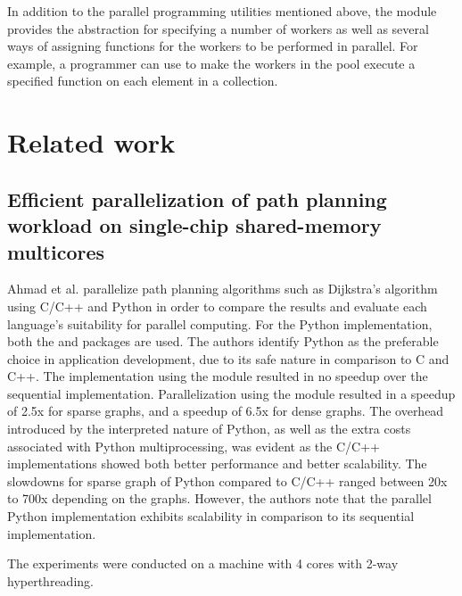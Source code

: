 In addition to the parallel programming utilities mentioned above, the  module provides the  abstraction
for specifying a number of workers as well as several ways of assigning functions for the workers to be performed in parallel. For
example, a programmer can use  to make the workers in the pool execute a specified function on each element in a
collection.

\section{Related work}
\subsection{Efficient parallelization of path planning workload on single-chip shared-memory multicores}
Ahmad et al. \cite{ahmad_2015_efficient_epoppwossm} parallelize path planning algorithms such as Dijkstra's algorithm using C/C++ and
Python in order to compare the results and evaluate each language's suitability for parallel computing. For the Python implementation,
both the  and  packages are used. The authors identify Python as the preferable choice 
in application development, due to its safe nature in comparison to C and C++. The implementation using the 
module resulted in no speedup over the sequential implementation. Parallelization using the  module resulted
in a speedup of 2.5x for sparse graphs, and a speedup of 6.5x for dense graphs. The overhead introduced by the interpreted nature
of Python, as well as the extra costs associated with Python multiprocessing, was evident as the C/C++ implementations showed both
better performance and better scalability. The slowdowns for sparse graph of Python compared to C/C++ ranged between
20x to 700x depending on the graphs.
However, the authors note that the parallel Python implementation exhibits scalability in comparison to its sequential implementation.

The experiments were conducted on a machine with 4 cores with 2-way hyperthreading.


